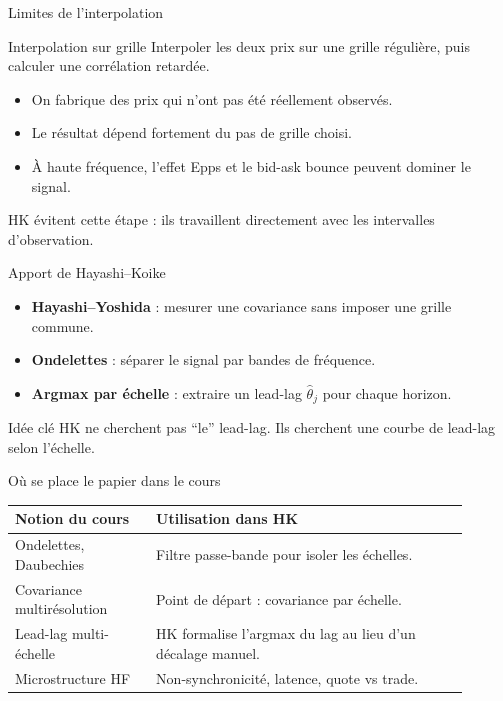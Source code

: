 \documentclass[10pt,aspectratio=169]{beamer}
\newcommand{\thetahat}{\hat{\theta}}
\begin{document}
\begin{frame}{Limites de l'interpolation}
  \begin{block}{Interpolation sur grille}
    Interpoler les deux prix sur une grille régulière, puis calculer une corrélation retardée.
  \end{block}

  \vspace{0.25cm}
  \begin{itemize}
    \item On fabrique des prix qui n'ont pas été réellement observés.
    \item Le résultat dépend fortement du pas de grille choisi.
    \item À haute fréquence, l'effet Epps et le bid-ask bounce peuvent dominer le signal.
  \end{itemize}

  \vspace{0.25cm}
  HK évitent cette étape : ils travaillent directement avec les intervalles d'observation.
\end{frame}

\begin{frame}{Apport de Hayashi--Koike}
  \begin{itemize}
    \item \textbf{Hayashi--Yoshida} : mesurer une covariance sans imposer une grille commune.
    \item \textbf{Ondelettes} : séparer le signal par bandes de fréquence.
    \item \textbf{Argmax par échelle} : extraire un lead-lag \(\thetahat_j\) pour chaque horizon.
  \end{itemize}

  \vspace{0.3cm}
  \begin{exampleblock}{Idée clé}
    HK ne cherchent pas ``le'' lead-lag. Ils cherchent une courbe de lead-lag selon l'échelle.
  \end{exampleblock}
\end{frame}

\begin{frame}{Où se place le papier dans le cours}
  \small
  \begin{tabular}{p{0.28\linewidth}p{0.62\linewidth}}
    \toprule
    \textbf{Notion du cours} & \textbf{Utilisation dans HK} \\
    \midrule
    Ondelettes, Daubechies & Filtre passe-bande pour isoler les échelles. \\
    Covariance multirésolution & Point de départ : covariance par échelle. \\
    Lead-lag multi-échelle & HK formalise l'argmax du lag au lieu d'un décalage manuel. \\
    Microstructure HF & Non-synchronicité, latence, quote vs trade. \\
    \bottomrule
  \end{tabular}
\end{frame}
\end{document}
